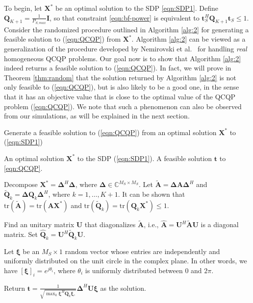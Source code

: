 \documentclass[twocolumn,10pt]{IEEEtran}
\theoremstyle{plain} \newtheorem{theorem}{Theorem}
\theoremstyle{plain} \newtheorem{proposition}{Proposition}
\theoremstyle{plain} \newtheorem{corollary}{Corollary}
\theoremstyle{remark} \newtheorem{remark}{Remark}
\theoremstyle{remark} \newtheorem{lemma}{Lemma}
\theoremstyle{plain} \newtheorem{definition}{Definition}
\theoremstyle{plain} \newtheorem{assumption}{Assumption}
\theoremstyle{plain} \newtheorem{fact}{Fact}
\begin{document}
To begin, let $\mathbf{X}^*$ be an optimal solution to the SDP \eqref{eqn:SDP1}.  Define $\mathbf{Q}_{K+1}=\frac{1}{P_{S,max}}\mathbf{I}$, so that constraint \eqref{eqn:bf-power} is equivalent to $\mathbf{t}_S^H\mathbf{Q}_{K+1}\mathbf{t}_S \leq 1$.  Consider the randomized procedure outlined in Algorithm \ref{alg:2} for generating a feasible solution to (\ref{eqn:QCQP}) from $\mathbf{X}^*$.  Algorithm \ref{alg:2} can be viewed as a generalization of the procedure developed by Nemirovski et al.~\cite{NRT99} for handling {\it real} homogeneous QCQP problems.  Our goal now is to show that Algorithm \ref{alg:2} indeed returns a feasible solution to (\ref{eqn:QCQP}).  In fact, we will prove in Theorem \ref{thm:random} that the solution returned by Algorithm \ref{alg:2} is not only feasible to (\ref{eqn:QCQP}), but is also likely to be a good one, in the sense that it has an objective value that is close to the optimal value of the QCQP problem (\ref{eqn:QCQP}).  We note that such a phenomenon can also be observed from our simulations, as will be explained in the next section.

\begin{algorithm}
\caption{Generate a feasible solution to (\ref{eqn:QCQP}) from an optimal solution $\mathbf{X}^*$ to (\ref{eqn:SDP1})}\label{alg:2}
\begin{algorithmic}[1]
\REQUIRE An optimal solution $\mathbf{X}^*$ to the SDP (\ref{eqn:SDP1}).
\ENSURE A feasible solution $\mathbf{t}$ to \eqref{eqn:QCQP}.

\STATE Decompose $\mathbf{X}^*=\mathbf{\Delta}^H\mathbf{\Delta}$, where $\mathbf{\Delta}\in\mathbb{C}^{M_S \times M_S}$. Let $\widetilde{\mathbf{A}}=\mathbf{\Delta}\mathbf{A}\mathbf{\Delta}^H$ and $\widetilde{\mathbf{Q}}_k=\mathbf{\Delta}\mathbf{Q}_k\mathbf{\Delta}^H$, where $k=1,\ldots,K+1$.  It can be shown that $\mathrm{tr}(\widetilde{\mathbf{A}})=\mathrm{tr}(\mathbf{A}\mathbf{X}^*)$ and $\mathrm{tr}(\widetilde{\mathbf{Q}}_k)=\mathrm{tr}(\mathbf{Q}_k\mathbf{X}^*)\leq 1$.

\STATE Find an unitary matrix $\mathbf{U}$ that diagonalizes $\widetilde{\mathbf{A}}$, i.e., $\widehat{\mathbf{A}}=\mathbf{U}^H\widetilde{\mathbf{A}}\mathbf{U}$ is a diagonal matrix. Set $\widehat{\mathbf{Q}}_k=\mathbf{U}^H\widetilde{\mathbf{Q}}_k\mathbf{U}$.

\STATE Let $\mathbf{\xi}$ be an $M_S\times1$ random vector whose entries are independently and uniformly distributed on the unit circle in the complex plane. In other words, we have $[\mathbf{\xi}]_i=e^{j\theta_i}$, where $\theta_i$ is uniformly distributed between 0 and $2\pi$.

\STATE Return $\mathbf{t}=\frac{1}{\sqrt{ \max_k \mathbf{\xi}^H\widehat{\mathbf{Q}}_k\mathbf{\xi}, }}\mathbf{\Delta}^H\mathbf{U}\mathbf{\xi}$ as the solution.
\end{algorithmic}
\end{algorithm}
\end{document}
